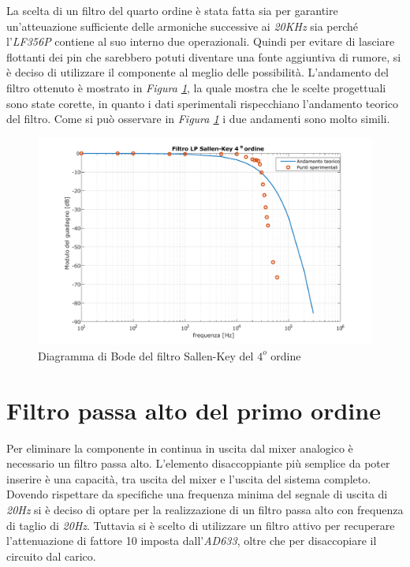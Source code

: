 \documentclass[titlepage]{report}
\begin{document}
	La scelta di un filtro del quarto ordine è stata fatta sia per garantire un'atteuazione sufficiente delle armoniche successive ai \textit{20KHz} sia perché l'\textit{LF356P} contiene al suo interno due operazionali. Quindi per evitare di lasciare flottanti dei pin che sarebbero potuti diventare una fonte aggiuntiva di rumore, si è deciso di utilizzare il componente al meglio delle possibilità.
	L'andamento del filtro ottenuto è mostrato in \textit{Figura \ref{fig:BODELp4Real}}, la quale mostra che le scelte progettuali sono state corette, in quanto i dati sperimentali rispecchiano l'andamento teorico del filtro.
	Come si può osservare in \textit{Figura \ref{fig:BODELp4Real}} i due andamenti sono molto simili.
	
	\begin{figure}[h]
		\centering
		\includegraphics[scale=0.7]{Immagini/bode_lp4.pdf}
		\caption{Diagramma di Bode del filtro Sallen-Key del $4^o$ ordine}
		\label{fig:BODELp4Real}
	\end{figure}
	
\newpage
\section{Filtro passa alto del primo ordine}
\label{sec:filtro_hp1}
	Per eliminare la componente in continua in uscita dal mixer analogico è necessario un filtro passa alto. L'elemento disaccoppiante più semplice da poter inserire è una capacità, tra uscita del mixer e l'uscita del sistema completo.
	Dovendo rispettare da specifiche una frequenza minima del segnale di uscita di \textit{20Hz} si è deciso di optare per la realizzazione di un filtro passa alto con frequenza di taglio di \textit{20Hz}. Tuttavia si è scelto di utilizzare un filtro attivo per recuperare l'attenuazione di fattore 10 imposta dall'\textit{AD633}, oltre che per disaccopiare il circuito dal carico.
	
\end{document}
